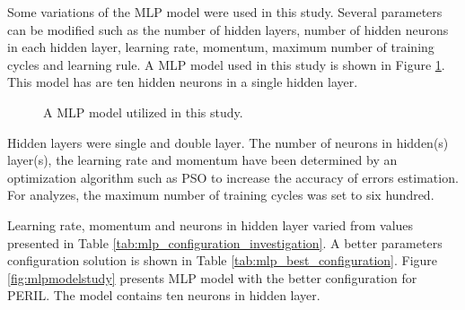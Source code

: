 Some variations of the MLP model were used in this study. Several parameters can be modified such as the number of hidden layers, number of hidden neurons in each hidden layer, learning rate, momentum, maximum number of training cycles and learning rule. A MLP model used in this study is shown in Figure \ref{fig:mlp_example}. This model has are ten hidden neurons in a single hidden layer.

\begin{figure}[!h]
  \vspace{-0.2cm}
  \centering
  \def \svgwidth{0.55\columnwidth}
  
  \caption{A MLP model utilized in this study.}
  \label{fig:mlp_example}
\end{figure} 

Hidden layers were single and double layer. The number of neurons in hidden(s) layer(s), the learning rate and momentum have been determined by an optimization algorithm such as PSO to increase the accuracy of errors estimation. For analyzes, the maximum number of training cycles was set to six hundred.

Learning rate, momentum and neurons in hidden layer varied from values presented in Table \ref{tab:mlp_configuration_investigation}. A better parameters configuration solution is shown in Table \ref{tab:mlp_best_configuration}. Figure \ref{fig:mlpmodelstudy} presents MLP model with the better configuration for PERIL. The model contains ten neurons in hidden layer.

